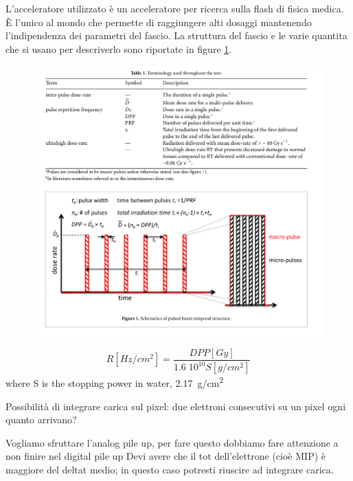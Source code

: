 L'acceleratore utilizzato è un acceleratore per ricerca sulla flash di fisica medica. È l'unico al mondo che permette di raggiungere alti dosaggi mantenendo l'indipendenza dei parametri del fascio. La struttura del fascio e le varie quantita che si usano per descriverlo sono riportate in figure \ref{fig:}.



\begin{figure}
    \centering
    \includegraphics[width=.98\linewidth]{figures/test_beam/dose_param.png}
    \caption{}
    \label{fig:}
 \end{figure}


 \begin{equation}
    R[Hz/cm^2] = \frac{DPP[Gy]}{1.6 \;10^{10} S[g/cm^2]}
 \end{equation}
 where S is the stopping power in water, \SI{2.17}{g/cm\squared}


 Possibilità di integrare carica sul pixel: due elettroni consecutivi su un pixel ogni quanto arrivano?

Vogliamo sfruttare l'analog pile up, per fare questo dobbiamo fare attenzione a non finire nel digital pile up
Devi avere che il tot dell'elettrone (cioè MIP) è maggiore del deltat medio; in questo caso potresti riuscire ad integrare carica.

